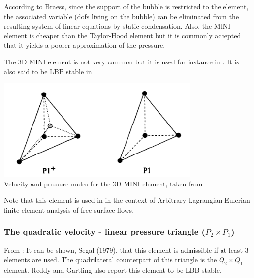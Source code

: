 \begin{remark}
According to Braess\cite{braess}, since the support of the bubble is restricted to the element, 
the associated variable (dofs living on the bubble) can be eliminated from the resulting 
system of linear equations by static condensation. 
Also, the MINI element is cheaper than the Taylor-Hood element but it is commonly accepted
that it yields a poorer approximation of the pressure.
\end{remark}

The 3D MINI element is not very common but it is used for instance in \cite{pico98}.
It is also said to be LBB stable in \cite[p180]{reddybook2}.

\begin{center}
\includegraphics[width=10cm]{images/mini/mini3D}\\
{\captionfont Velocity and pressure nodes for the 3D MINI element, taken from \cite{pico98}}
\end{center}

Note that this element is used in \cite{brwr00} in the context of Arbitrary Lagrangian Eulerian 
finite element analysis of free surface flows.








\subsubsection{The quadratic velocity - linear pressure triangle ($P_2\times P_1$)}

From \cite{segal}: 
It can be shown, Segal (1979), that this element is admissible if at least 3 elements 
are used. The quadrilateral counterpart of this triangle is the $Q_2\times Q_1$ element.
Reddy and Gartling \cite[p179]{reddybook2} also report this element to be LBB stable.




